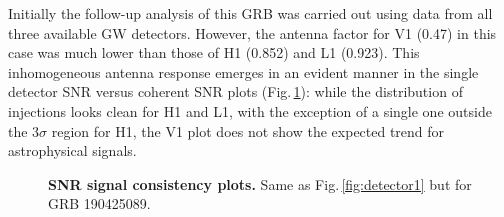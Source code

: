 \documentclass[binding=0.6cm, LaM]{sapthesis}
\begin{document}
	Initially the follow-up analysis of this GRB was carried out using data from all three available GW detectors.
        However, the antenna factor for V1 (0.47) in this case was much lower than those of H1 (0.852) and L1 (0.923).
        This inhomogeneous antenna response emerges in an evident manner in the  single detector SNR versus coherent SNR plots (Fig.\,\ref{fig:detector3}):
        while the distribution of injections looks clean for H1 and L1, with the exception of a single one outside the $3 \sigma$ region for H1,
        the V1 plot does not show the expected trend for astrophysical signals.
        \begin{figure}[!t]
          \noindent
          \label{detector3}
          \centering
          \caption{{\bf SNR signal consistency plots.} Same as Fig.\,\ref{fig:detector1} but for GRB 190425089.}
          \label{fig:detector3}
        \end{figure}
\end{document}
